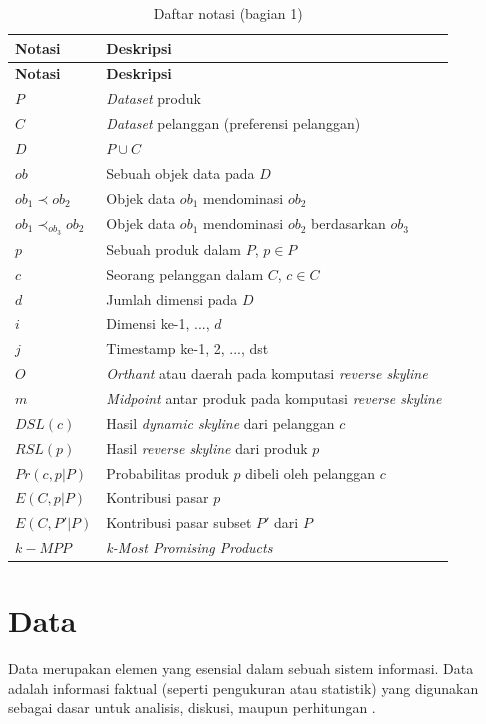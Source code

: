 \begin{longtable}{| p{3cm} | p{6cm} |} 
	\caption{Daftar notasi (bagian 1) \label{tab:daftar-notasi-1}}\\
	\hline
	\textbf{Notasi} & \textbf{Deskripsi}\\ \hline
	\endfirsthead
	\hline
	\textbf{Notasi} & \textbf{Deskripsi}\\ \hline
	\endhead
	$P$ & \textit{Dataset} produk\\ \hline
	$C$ & \textit{Dataset} pelanggan (preferensi pelanggan)\\ \hline
	$D$ & $P \cup C$ \\ \hline
	$ob$ & Sebuah objek data pada $D$\\ \hline
	$ob_1 \prec ob_2$ & Objek data $ob_1$ mendominasi $ob_2$\\ \hline
	$ob_1 \prec_{ob_3} ob_2$ & Objek data $ob_1$ mendominasi $ob_2$ berdasarkan $ob_3$\\ \hline
	$p$ & Sebuah produk dalam $P$, $p \in P$\\ \hline
	$c$ & Seorang pelanggan dalam $C$, $c \in C$\\ \hline
	$d$ & Jumlah dimensi pada $D$\\ \hline
	$i$ & Dimensi ke-1, ..., $d$\\ \hline
	$j$ & Timestamp ke-1, 2, ..., dst\\ \hline
	$O$ & \textit{Orthant} atau daerah pada komputasi \textit{reverse skyline}\\ \hline
	$m$ & \textit{Midpoint} antar produk pada komputasi \textit{reverse skyline}\\ \hline
	$DSL(c)$ & Hasil \textit{dynamic skyline} dari pelanggan $c$\\ \hline
	$RSL(p)$ & Hasil \textit{reverse skyline} dari produk $p$\\ \hline
	$Pr(c, p|P)$ & Probabilitas produk $p$ dibeli oleh pelanggan $c$ \\ \hline
	$E(C, p|P)$ & Kontribusi pasar $p$\\ \hline
	$E(C, P'|P)$ & Kontribusi pasar subset $P'$ dari $P$ \\ \hline
	$k-MPP$ & \textit{k-Most Promising Products} \\ \hline
\end{longtable}

\section{Data}
\tab Data merupakan elemen yang esensial dalam sebuah sistem informasi. Data adalah informasi faktual (seperti pengukuran atau statistik) yang digunakan sebagai dasar untuk analisis, diskusi, maupun perhitungan \cite{data}. 

